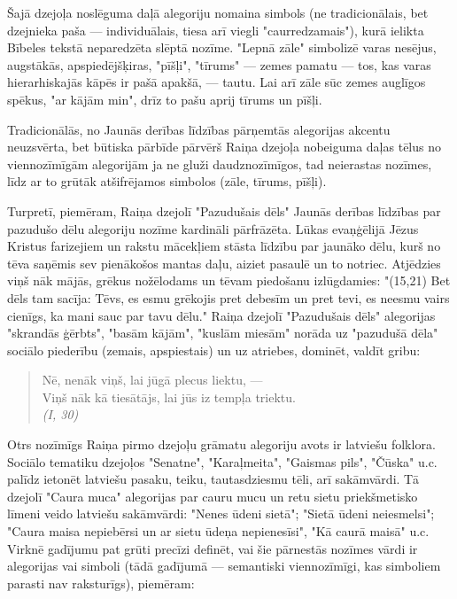 \documentclass[11pt]{article}
\begin{document}
Šajā dzejoļa noslēguma daļā alegoriju nomaina
simbols (ne tradicionālais, bet dzejnieka paša
--- individuālais, tiesa arī viegli "caurredzamais"),
kurā ielikta Bībeles tekstā neparedzēta slēptā nozīme.
"Lepnā zāle" simbolizē varas nesējus,
augstākās, apspiedējšķiras, "pīšļi", "tīrums" ---
zemes pamatu --- tos, kas varas hierarhiskajās kāpēs ir pašā
apakšā, --- tautu. Lai arī zāle sūc zemes auglīgos
spēkus, "ar kājām min", drīz to pašu aprij tīrums
un pīšļi.

Tradicionālās, no Jaunās derības līdzības pārņemtās
alegorijas akcentu neuzsvērta, bet būtiska pārbīde
pārvērš Raiņa dzejoļa nobeiguma daļas tēlus no
viennozīmīgām alegorijām ja ne gluži daudznozīmīgos,
tad neierastas nozīmes, līdz ar to grūtāk atšifrējamos
simbolos (zāle, tīrums, pīšļi).

Turpretī, piemēram, Raiņa dzejolī "Pazudušais dēls" Jaunās
derības līdzības par pazudušo dēlu alegoriju nozīme kardināli
pārfrāzēta. Lūkas evaņģēlijā Jēzus Kristus farizejiem
un rakstu mācekļiem stāsta līdzību par jaunāko
dēlu, kurš no tēva saņēmis sev pienākošos mantas daļu,
aiziet pasaulē un to notriec. Atjēdzies viņš nāk mājās,
grēkus nožēlodams un tēvam piedošanu izlūgdamies:
"(15,21) Bet dēls tam sacīja: Tēvs, es esmu
grēkojis pret debesīm un pret tevi, es neesmu vairs cienīgs,
ka mani sauc par tavu dēlu." Raiņa dzejolī
"Pazudušais dēls" alegorijas "skrandās ģērbts",
"basām kājām", "kuslām miesām" norāda uz "pazudušā dēla"
sociālo piederību (zemais, apspiestais) un uz
atriebes, dominēt, valdīt gribu:

\begin{quote}
Nē, nenāk viņš, lai jūgā plecus liektu, ---\\
Viņš nāk kā tiesātājs, lai jūs iz tempļa triektu.\\
{\em (I, 30)}
\end{quote}

Otrs nozīmīgs Raiņa pirmo dzejoļu grāmatu alegoriju
avots ir latviešu folklora. Sociālo tematiku
dzejoļos "Senatne", "Karaļmeita", "Gaismas pils",
"Čūska" u.c. palīdz ietonēt latviešu pasaku, teiku,
tautasdziesmu tēli, arī sakāmvārdi. Tā dzejolī "Caura muca"
alegorijas par cauru mucu un retu sietu priekšmetisko
līmeni veido latviešu sakāmvārdi: "Nenes ūdeni sietā";
"Sietā ūdeni neiesmelsi"; "Caura maisa nepiebērsi un ar sietu
ūdeņa nepienesīsi", "Kā caurā maisā" u.c. Virknē
gadījumu pat grūti precīzi definēt, vai šie pārnestās nozīmes
vārdi ir alegorijas vai simboli (tādā gadījumā ---
semantiski viennozīmīgi, kas simboliem parasti nav
raksturīgs), piemēram:
\end{document}
